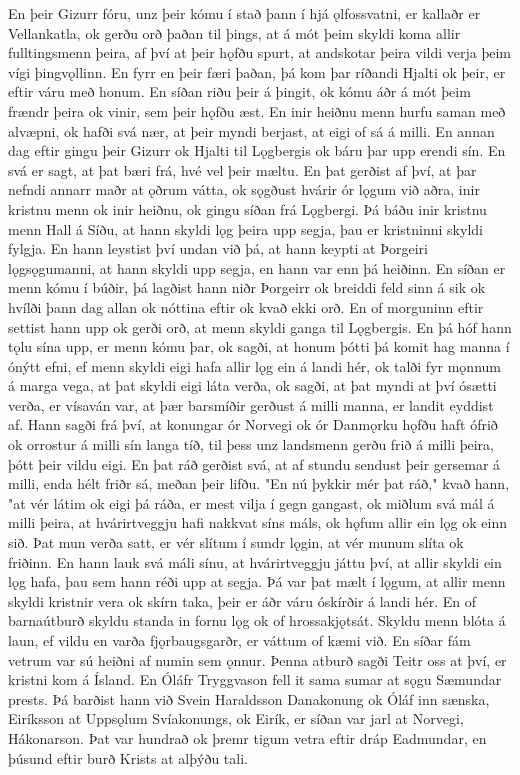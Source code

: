 En þeir Gizurr fóru, unz þeir kómu í stað þann í hjá ǫlfossvatni, er kallaðr er Vellankatla, ok gerðu orð þaðan til þings, at á mót þeim skyldi koma allir fulltingsmenn þeira, af því at þeir hǫfðu spurt, at andskotar þeira vildi verja þeim vígi þingvǫllinn. En fyrr en þeir færi þaðan, þá kom þar ríðandi Hjalti ok þeir, er eftir váru með honum.
En síðan riðu þeir á þingit, ok kómu áðr á mót þeim frændr þeira ok vinir, sem þeir hǫfðu æst. En inir heiðnu menn hurfu saman með alvæpni, ok hafði svá nær, at þeir myndi berjast, at eigi of sá á milli.
En annan dag eftir gingu þeir Gizurr ok Hjalti til Lǫgbergis ok báru þar upp erendi sín. En svá er sagt, at þat bæri frá, hvé vel þeir mæltu. En þat gerðist af því, at þar nefndi annarr maðr at ǫðrum vátta, ok sǫgðust hvárir ór lǫgum við aðra, inir kristnu menn ok inir heiðnu, ok gingu síðan frá Lǫgbergi.
Þá báðu inir kristnu menn Hall á Síðu, at hann skyldi lǫg þeira upp segja, þau er kristninni skyldi fylgja. En hann leystist því undan við þá, at hann keypti at Þorgeiri lǫgsǫgumanni, at hann skyldi upp segja, en hann var enn þá heiðinn.
En síðan er menn kómu í búðir, þá lagðist hann niðr Þorgeirr ok breiddi feld sinn á sik ok hvílði þann dag allan ok nóttina eftir ok kvað ekki orð. En of morguninn eftir settist hann upp ok gerði orð, at menn skyldi ganga til Lǫgbergis.
En þá hóf hann tǫlu sína upp, er menn kómu þar, ok sagði, at honum þótti þá komit hag manna í ónýtt efni, ef menn skyldi eigi hafa allir lǫg ein á landi hér, ok talði fyr mǫnnum á marga vega, at þat skyldi eigi láta verða, ok sagði, at þat myndi at því ósætti verða, er vísaván var, at þær barsmíðir gerðust á milli manna, er landit eyddist af. Hann sagði frá því, at konungar ór Norvegi ok ór Danmǫrku hǫfðu haft ófrið ok orrostur á milli sín langa tíð, til þess unz landsmenn gerðu frið á milli þeira, þótt þeir vildu eigi. En þat ráð gerðist svá, at af stundu sendust þeir gersemar á milli, enda hélt friðr sá, meðan þeir lifðu. "En nú þykkir mér þat ráð," kvað hann, "at vér látim ok eigi þá ráða, er mest vilja í gegn gangast, ok miðlum svá mál á milli þeira, at hvárirtveggju hafi nakkvat síns máls, ok hǫfum allir ein lǫg ok einn sið. Þat mun verða satt, er vér slítum í sundr lǫgin, at vér munum slíta ok friðinn.
En hann lauk svá máli sínu, at hvárirtveggju játtu því, at allir skyldi ein lǫg hafa, þau sem hann réði upp at segja.
Þá var þat mælt í lǫgum, at allir menn skyldi kristnir vera ok skírn taka, þeir er áðr váru óskírðir á landi hér. En of barnaútburð skyldu standa in fornu lǫg ok of hrossakjǫtsát. Skyldu menn blóta á laun, ef vildu en varða fjǫrbaugsgarðr, er váttum of kæmi við. En síðar fám vetrum var sú heiðni af numin sem ǫnnur.
Þenna atburð sagði Teitr oss at því, er kristni kom á Ísland. En Óláfr Tryggvason fell it sama sumar at sǫgu Sæmundar prests. Þá barðist hann við Svein Haraldsson Danakonung ok Óláf inn sænska, Eiríksson at Uppsǫlum Svíakonungs, ok Eirík, er síðan var jarl at Norvegi, Hákonarson. Þat var hundrað ok þremr tigum vetra eftir dráp Eadmundar, en þúsund eftir burð Krists at alþýðu tali.


